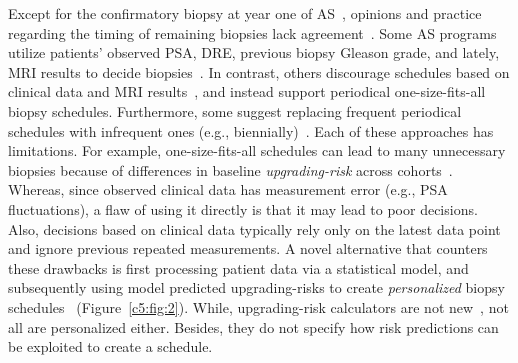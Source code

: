Except for the confirmatory biopsy at year one of AS~\citep{bokhorst2015compliance}, opinions and practice regarding the timing of remaining biopsies lack agreement~\citep{nieboer2018active}. Some AS programs utilize patients' observed PSA, DRE, previous biopsy Gleason grade, and lately, MRI results to decide biopsies~\citep{kasivisvanathan2020magnetic,bul2013active,nieboer2018active}. In contrast, others discourage schedules based on clinical data and MRI results~\citep{chesnut2019role,loeb2014heterogeneity}, and instead support periodical one-size-fits-all biopsy schedules. Furthermore, some suggest replacing frequent periodical schedules with infrequent ones (e.g., biennially)~\citep{inoue2018comparative,de2017estimating}. Each of these approaches has limitations. For example, one-size-fits-all schedules can lead to many unnecessary biopsies because of differences in baseline \emph{upgrading-risk} across cohorts~\citep{inoue2018comparative}. Whereas, since observed clinical data has measurement error (e.g., PSA fluctuations), a flaw of using it directly is that it may lead to poor decisions. Also, decisions based on clinical data typically rely only on the latest data point and ignore previous repeated measurements. A novel alternative that counters these drawbacks is first processing patient data via a statistical model, and subsequently using model predicted upgrading-risks to create \emph{personalized} biopsy schedules~\citep{nieboer2018active} (Figure~\ref{c5:fig:2}). While, upgrading-risk calculators are not new~\citep{coley2017prediction,ankerst2015precision,partin1993use,makarov2007updated}, not all are personalized either. Besides, they do not specify how risk predictions can be exploited to create a schedule.

